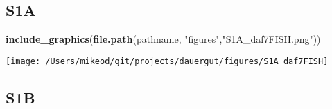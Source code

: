 \documentclass[]{article}
\newenvironment{Shaded}{\begin{snugshade}}{\end{snugshade}}
\newcommand{\KeywordTok}[1]{\textcolor[rgb]{0.13,0.29,0.53}{\textbf{#1}}}
\newcommand{\StringTok}[1]{\textcolor[rgb]{0.31,0.60,0.02}{#1}}
\newcommand{\NormalTok}[1]{#1}
\begin{document}
\subsection{S1A}\label{s1a}

\begin{Shaded}
\begin{Highlighting}[]
\KeywordTok{include_graphics}\NormalTok{(}\KeywordTok{file.path}\NormalTok{(pathname, }\StringTok{"figures"}\NormalTok{,}\StringTok{"S1A_daf7FISH.png"}\NormalTok{))}
\end{Highlighting}
\end{Shaded}

\texttt{[image: /Users/mikeod/git/projects/dauergut/figures/S1A\_daf7FISH]}

\subsection{S1B}\label{s1b}
\end{document}
